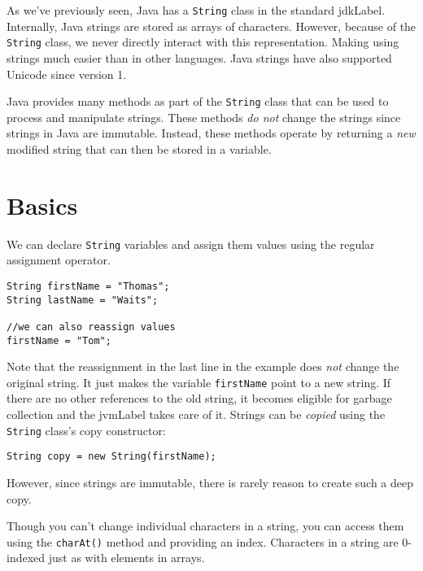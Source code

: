 

As we've previously seen, Java has a \texttt{String} 
class in the standard \gls{jdkLabel}.  Internally, Java 
strings are stored as arrays of characters.  However, because
of the \texttt{String} class, we never directly 
interact with this representation. Making using strings
much easier than in other languages.  Java strings have
also supported \gls{Unicode} since version 1.

Java provides many methods as part of the 
\texttt{String} class that can be used to process
and manipulate strings.  These methods \emph{do not} change
the strings since strings in Java are \gls{immutable}.  
Instead, these methods operate by returning a \emph{new}
modified string that can then be stored in a variable.

\section{Basics}

We can declare \texttt{String}
variables and assign them values using the regular
assignment operator.

\begin{verbatim}
String firstName = "Thomas";
String lastName = "Waits";

//we can also reassign values
firstName = "Tom";
\end{verbatim}

Note that the reassignment in the last line in the example
does \emph{not} change the original string.  It just makes
the variable \texttt{firstName} point to a new
string.  If there are no other references to the old string,
it becomes eligible for garbage collection and the \gls{jvmLabel}
takes care of it. Strings can be \emph{copied} using the 
\texttt{String} class's copy constructor: 

\texttt{String copy = new String(firstName);}

However, since strings are immutable, there is rarely reason
to create such a \gls{deep copy}.

Though you can't change individual characters in a string, 
you can access them using the \texttt{charAt()}
method and providing an index.  Characters in a string are
0-indexed just as with elements in arrays. 

